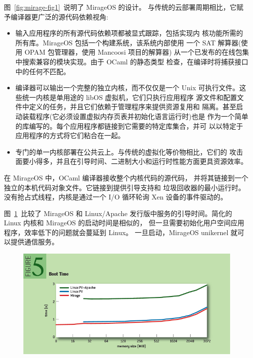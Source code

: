 \documentclass[UTF8,fontset=none,linespread=1.15]{ctexart}
\begin{document}
图\ \ref{fig:mirage-fig1}\ 说明了 MirageOS 的设计。
与传统的云部署周期相比，它赋予编译器更广泛的源代码依赖视角:

\begin{itemize}
\item 输入应用程序的所有源代码依赖项都被显式跟踪，包括实现内
核功能所需的所有库。MirageOS 包括一个构建系统，该系统内部使用
一个 SAT 解算器(使用 OPAM 包管理器，使用 Mancoosi 项目的解算器)
从一个已发布的在线包集中搜索兼容的模块实现。由于 OCaml 的静态类型
检查，在编译时将捕获接口中的任何不匹配。
\item  编译器可以输出一个完整的独立内核，而不仅仅是一个 Unix
可执行文件。这些统一内核是单用途的 libOS 虚拟机，它们只执行应用程序
源文件和配置文件中定义的任务，并且它们依赖于管理程序来提供资源复用和
隔离。甚至启动装载程序(它必须设置虚拟内存页表并初始化语言运行时)也是
作为一个简单的库编写的。每个应用程序都链接到它需要的特定库集合，并可
以以特定于应用程序的方式将它们粘合在一起。
\item 专门的单一内核部署在公共云上。与传统的虚拟化等价物相比，它们的
攻击面要小得多，并且在引导时间、二进制大小和运行时性能方面更具资源效率。
\end{itemize}

在 MirageOS 中，OCaml 编译器接收整个内核代码的源代码，
并将其链接到一个独立的本机代码对象文件。它链接到提供引导支持和
垃圾回收器的最小运行时。没有抢占式线程，内核是通过一个 I/O 循环轮询
Xen 设备的事件驱动的。

图\ \ref{fig:mirage-fig5}\ 比较了 MirageOS 和 Linux/Apache
发行版中服务的引导时间。简化的 Linux 内核和 MirageOS 的启动时间是相似的，
但一旦需要初始化用户空间应用程序，效率低下的问题就会蔓延到 Linux。
一旦启动，MirageOS unikernel 就可以提供通信服务。

\begin{figure}[!hbt]
\includegraphics[width=\linewidth]{pictures/figure5.png}
\caption{}\label{fig:mirage-fig5}
\end{figure}
\end{document}
